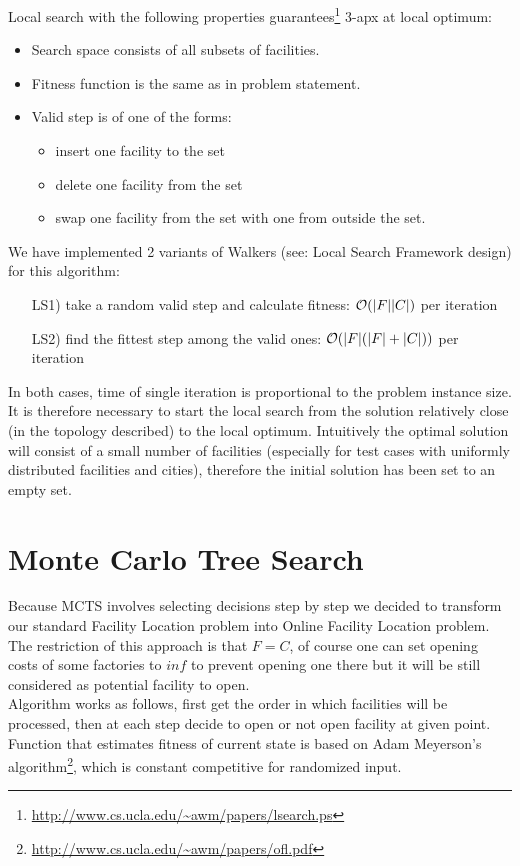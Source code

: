 Local search with the following properties
guarantees\footnote{\url{http://www.cs.ucla.edu/~awm/papers/lsearch.ps}}
3-apx at local optimum:
\begin{itemize}
\item Search space consists of all subsets of facilities.
\item Fitness function is the same as in problem statement.
\item Valid step is of one of the forms:
	\begin{itemize}
	\item insert one facility to the set
	\item delete one facility from the set
	\item swap one facility from the set with one from outside the set.
	\end{itemize}
\end{itemize}

We have implemented 2 variants of Walkers (see: Local Search Framework design)
for this algorithm:
\begin{itemize}
\item[LS1)] take a random valid step and calculate fitness: $\mathcal{O}(|F||C|)$ per iteration
\item[LS2)] find the fittest step among the valid ones: $\mathcal{O}(|F|(|F|+|C|))$ per iteration
\end{itemize}

In both cases, time of single iteration is proportional to the problem
instance size. It is therefore necessary to start the local search from
the solution relatively close (in the topology described) to the local
optimum. Intuitively the optimal solution will consist of a small number
of facilities (especially for test cases with uniformly distributed facilities and cities),
therefore the initial solution has been set to an empty set.

\section{Monte Carlo Tree Search}

Because MCTS involves selecting decisions step by step we decided to transform our
standard Facility Location problem into Online Facility Location problem.
The restriction of this approach is that $F = C$, of course one can set
opening costs of some factories to $inf$ to prevent opening one there
but it will be still considered as potential facility to open. \\
Algorithm works as follows, first get the order in which facilities will be
processed, then at each step decide to open or not open facility at given point. \\
Function that estimates fitness of current state is based on
Adam Meyerson's algorithm\footnote{\url{http://www.cs.ucla.edu/~awm/papers/ofl.pdf}},
which is constant competitive for randomized input.

